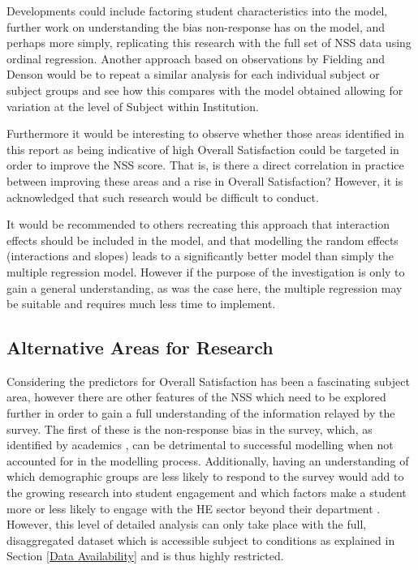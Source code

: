 \documentclass[11pt,a4paper]{report}
\begin{document}
Developments could include factoring student characteristics into the model, further work on understanding the bias non-response has on the model, and perhaps more simply, replicating this research with the full set of NSS data using ordinal regression. Another approach based on observations by Fielding and Denson \cite{fielding2010sciencesubjects,denson2010whatpredicts} would be to repeat a similar analysis for each individual subject or subject groups and see how this compares with the model obtained allowing for variation at the level of Subject within Institution.

Furthermore it would be interesting to observe whether those areas identified in this report as being indicative of high Overall Satisfaction could be targeted in order to improve the NSS score. That is, is there a direct correlation in practice between improving these areas and a rise in Overall Satisfaction? However, it is acknowledged that such research would be difficult to conduct.

It would be recommended to others recreating this approach that interaction effects should be included in the model, and that modelling the random effects (interactions and slopes) leads to a significantly better model than simply the multiple regression model. However if the purpose of the investigation is only to gain a general understanding, as was the case here, the multiple regression may be suitable and requires much less time to implement. 

\subsection{Alternative Areas for Research}
Considering the predictors for Overall Satisfaction has been a fascinating subject area, however there are other features of the NSS which need to be explored further in order to gain a full understanding of the information relayed by the survey. The first of these is the non-response bias in the survey, which, as identified by academics \cite{hewson2011implications, cheng2010unicoursediffs}, can be detrimental to successful modelling when not accounted for in the modelling process. Additionally, having an understanding of which demographic groups are less likely to respond to the survey would add to the growing research into student engagement and which factors make a student more or less likely to engage with the HE sector beyond their department \cite{trowler2010student}. However, this level of detailed analysis can only take place with the full, disaggregated dataset which is accessible subject to conditions as explained in Section \ref{Data Availability} and is thus highly restricted. 
\end{document}
